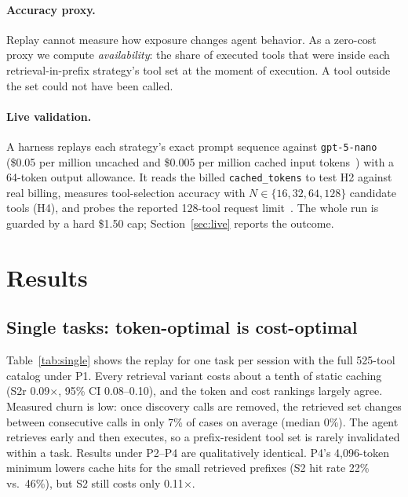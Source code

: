 \documentclass[11pt]{article}
\begin{document}
\paragraph{Accuracy proxy.} Replay cannot measure how exposure changes agent behavior. As a zero-cost proxy we compute \emph{availability}: the share of executed tools that were inside each retrieval-in-prefix strategy's tool set at the moment of execution. A tool outside the set could not have been called.

\paragraph{Live validation.} A harness replays each strategy's exact prompt sequence against \texttt{gpt-5-nano} (\$0.05 per million uncached and \$0.005 per million cached input tokens~\cite{oai_price}) with a 64-token output allowance. It reads the billed \texttt{cached\_tokens} to test H2 against real billing, measures tool-selection accuracy with $N \in \{16,32,64,128\}$ candidate tools (H4), and probes the reported 128-tool request limit~\cite{oai_limit}. The whole run is guarded by a hard \$1.50 cap; Section~\ref{sec:live} reports the outcome.

\section{Results}
\label{sec:results}
\subsection{Single tasks: token-optimal is cost-optimal}
Table~\ref{tab:single} shows the replay for one task per session with the full 525-tool catalog under P1. Every retrieval variant costs about a tenth of static caching (S2r 0.09$\times$, 95\% CI 0.08--0.10), and the token and cost rankings largely agree. Measured churn is low: once discovery calls are removed, the retrieved set changes between consecutive calls in only 7\% of cases on average (median 0\%). The agent retrieves early and then executes, so a prefix-resident tool set is rarely invalidated within a task. Results under P2--P4 are qualitatively identical. P4's 4,096-token minimum lowers cache hits for the small retrieved prefixes (S2 hit rate 22\% vs.\ 46\%), but S2 still costs only 0.11$\times$.
\end{document}
